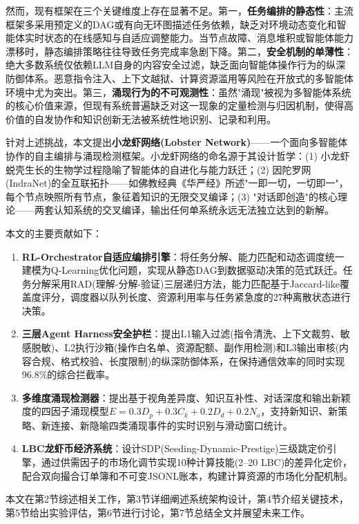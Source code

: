 \documentclass[12pt,a4paper]{ctexart}
\begin{document}
然而，现有框架在三个关键维度上存在显著不足。第一，\textbf{任务编排的静态性}：主流框架多采用预定义的DAG或有向无环图描述任务依赖，缺乏对环境动态变化和智能体实时状态的在线感知与自适应调整能力。当节点故障、消息堆积或智能体能力漂移时，静态编排策略往往导致任务完成率急剧下降。第二，\textbf{安全机制的单薄性}：绝大多数系统仅依赖LLM自身的内容安全过滤，缺乏面向智能体操作行为的纵深防御体系。恶意指令注入、上下文越狱、计算资源滥用等风险在开放式的多智能体环境中尤为突出。第三，\textbf{涌现行为的不可观测性}：虽然"涌现"被视为多智能体系统的核心价值来源，但现有系统普遍缺乏对这一现象的定量检测与归因机制，使得高价值的自发协作和知识创新无法被系统性地识别、记录和利用。

针对上述挑战，本文提出\textbf{小龙虾网络(Lobster Network)}——一个面向多智能体协作的自主编排与涌现检测框架。小龙虾网络的命名源于其设计哲学：(1) 小龙虾蜕壳生长的生物学过程隐喻了智能体的自进化与能力跃迁；(2) 因陀罗网(IndraNet)的全互联拓扑——如佛教经典《华严经》所述"一即一切，一切即一"，每个节点映照所有节点，象征着知识的无限交叉编译\cite{cook1977huayan}；(3) "对话即创造"的核心理论——两套认知系统的交叉编译，输出任何单系统永远无法独立达到的新解\cite{zhuge2026dialogue}。

本文的主要贡献如下：

\begin{enumerate}[leftmargin=2em]
  \item \textbf{RL-Orchestrator自适应编排引擎}：将任务分解、能力匹配和动态调度统一建模为Q-Learning优化问题，实现从静态DAG到数据驱动决策的范式跃迁。任务分解采用RAD(理解-分解-验证)三层递归方法，能力匹配基于Jaccard-like覆盖度评分，调度器以队列长度、资源利用率与任务紧急度的27种离散状态进行决策。
  \item \textbf{三层Agent Harness安全护栏}：提出L1输入过滤(指令清洗、上下文裁剪、敏感脱敏)、L2执行沙箱(操作白名单、资源配额、副作用检测)和L3输出审核(内容合规、格式校验、长度限制)的纵深防御体系，在保持通信效率的同时实现96.8\%的综合拦截率。
  \item \textbf{多维度涌现检测器}：提出基于视角差异度、知识互补性、对话深度和输出新颖度的四因子涌现模型$E = 0.3D_p + 0.3C_k + 0.2D_d + 0.2N_o$，支持新知识、新策略、新连接、新隐喻四类涌现事件的实时识别与滑动窗口统计。
  \item \textbf{LBC龙虾币经济系统}：设计SDP(Seeding-Dynamic-Prestige)三级跳定价引擎，通过供需因子的市场化调节实现10种计算技能(2--20 LBC)的差异化定价，配合双向撮合订单簿和不可变JSONL账本，构建计算资源的市场化分配机制。
\end{enumerate}

本文在第2节综述相关工作，第3节详细阐述系统架构设计，第4节介绍关键技术，第5节给出实验评估，第6节进行讨论，第7节总结全文并展望未来工作。
\end{document}
